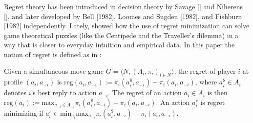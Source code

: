 \documentclass[fleqn,reqno,11pt]{article}
\begin{document}

Regret theory has been introduced in decision theory by Savage [] and Niherens [], and later
developed by Bell [1982], Loomes and Sugden [1982], and Fishburn [1982] independently. Lately,
\citet{HalpernPass2012:Iterated-Regret} showed how the use of regret minimization can solve
game theoretical puzzles (like the Centipede and the Traveller's dilemma) in a way that is
closer to everyday intuition and empirical data. In this paper the notion of regret is defined
as in \citet{HalpernPass2012:Iterated-Regret}:

\begin{definition} \label{defn:regret} Given a simultaneous-move
  game $ G=\langle N, (A_i , \pi_i)_{i \in N} \rangle $, the regret of player $i$ at profile
  $(a_i,a_{-i})$ is $\text{reg}(a_i,a_{-i}):= \pi_i(a_i^\$,a_{-i})-\pi_i(a_i,a_{-i}) $, where
  $a_i^\$ \in A_i$ denotes $i$'s best reply to action $a_{-i} $. The regret of an action
  $a_i \in A_i$ is then
  $\text{reg}(a_i):= \text{max}_{a_{-i}\in A_{-i}} \pi_i(a_i^\$,a_{-i})-\pi_i(a_i,a_{-i}) $. An
  action $a^{r}_i $ is regret minimizing if
  $a^{r}_i \in \text{min}_{a_i} \text{max}_{a_{-i}} \pi_i(a_i^\$,a_{-i})-\pi_i(a_i,a_{-i}) $.
\end{definition}
\end{document}
